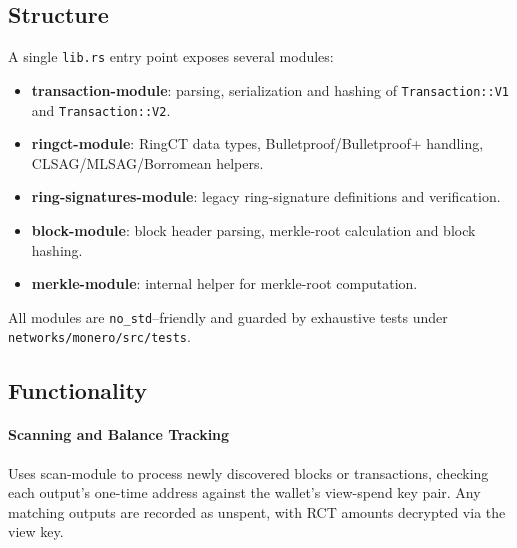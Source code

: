 \documentclass[12pt,a4paper]{article}
\begin{document}
\subsection*{Structure}

A single \texttt{lib.rs} entry point exposes several modules:

\begin{itemize}
  \item \textbf{\gls{transaction-module}}:
        parsing, serialization and hashing of
        \texttt{Transaction::V1} and \texttt{Transaction::V2}.
  \item \textbf{\gls{ringct-module}}:
        RingCT data types, Bulletproof/Bulletproof+ handling,
        \\CLSAG/MLSAG/Borromean helpers.
  \item \textbf{\gls{ring-signatures-module}}:
        legacy ring-signature definitions and verification.
  \item \textbf{\gls{block-module}}:
        block header parsing, merkle-root calculation and block hashing.
  \item \textbf{\gls{merkle-module}}:   internal helper for merkle-root
        computation.
\end{itemize}

All modules are \texttt{no\_std}–friendly and guarded by exhaustive
tests under \\\texttt{networks/monero/src/tests}.

\subsection*{Functionality}

\paragraph{Scanning and Balance Tracking}
Uses \gls{scan-module} to process newly discovered blocks or transactions,
checking each output’s one-time address against the wallet’s view-spend key
pair. Any matching outputs are recorded as unspent, with RCT amounts decrypted
via the view key.
\end{document}
